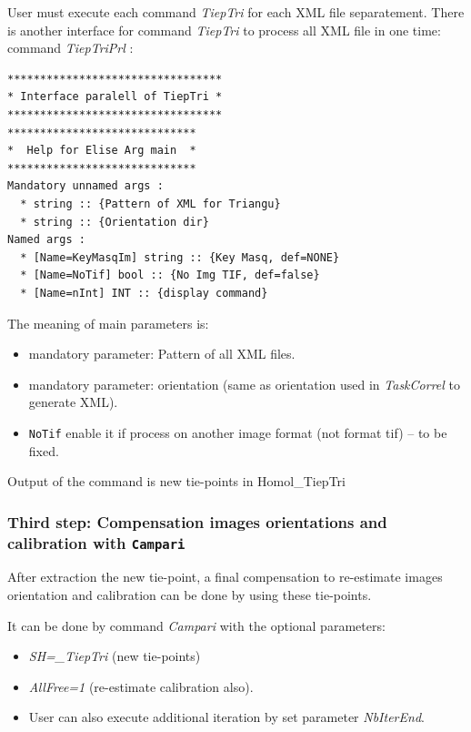 User must execute each command \textit{TiepTri} for each XML file separatement.
There is another interface for command \textit{TiepTri} to process all XML file in one time: command  \textit{TiepTriPrl} :
\begin{verbatim}
*********************************
* Interface paralell of TiepTri *
*********************************
*****************************
*  Help for Elise Arg main  *
*****************************
Mandatory unnamed args : 
  * string :: {Pattern of XML for Triangu}
  * string :: {Orientation dir}
Named args : 
  * [Name=KeyMasqIm] string :: {Key Masq, def=NONE}
  * [Name=NoTif] bool :: {No Img TIF, def=false}
  * [Name=nInt] INT :: {display command}
\end{verbatim}

The meaning of main parameters is:

\begin{itemize}
   \item mandatory parameter: Pattern of all XML files.
   
   \item mandatory parameter: orientation (same as orientation used in \textit{TaskCorrel} to generate XML).
   
    \item  {\tt NoTif} enable it if process on another image format (not format tif) -- to be fixed.
   
\end{itemize}

Output of the command is new tie-points in Homol\_TiepTri

\subsubsection{Third step: Compensation images orientations and calibration with  {\tt Campari}}


After extraction the new tie-point, a final compensation to re-estimate images orientation and calibration can be done by using these tie-points.


It can be done by command \textit{Campari} with the optional parameters:

\begin{itemize}
 \item \textit{SH=\_TiepTri} (new tie-points) 
 \item \textit{AllFree=1} (re-estimate calibration also). 
 \item User can also execute additional iteration by set parameter \textit{NbIterEnd}.
\end{itemize}


